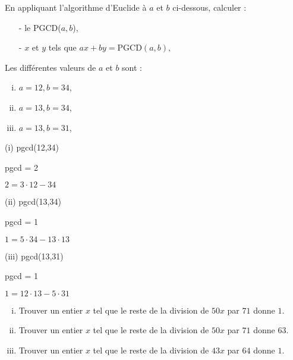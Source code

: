 
\vspace*{0.8cm}
\begin{exo}
En appliquant l'algorithme d'Euclide \`a $a$ et $b$ ci-dessous, calculer :
\begin{itemize}
\item[-] le PGCD($a,b$),
\item[-] $x$ et $y$ tels que $ ax + by = \text{PGCD}(a,b),$
\end{itemize}
Les diff\'erentes valeurs de $a$ et $b$ sont :
\begin{enumerate}[(i)]
\item $a = 12, b = 34$,
\item $a = 13, b = 34$,
\item $a = 13, b = 31$,
\end{enumerate}
\end{exo}

\begin{minipage}{0.33\textwidth}
   (i) pgcd(12,34)
   \vspace{0.5cm}

   pgcd = 2
   \vspace{0.5cm}

   $2 = 3 \cdot 12 - 34$
\end{minipage}\begin{minipage}{0.33\textwidth}
   (ii) pgcd(13,34)
   \vspace{0.5cm}

   pgcd = 1
   \vspace{0.5cm}

   $1 = 5 \cdot 34 - 13 \cdot 13 $
\end{minipage}\begin{minipage}{0.33\textwidth}
   (iii) pgcd(13,31)
   \vspace{0.5cm}

   pgcd = 1
   \vspace{0.5cm}

   $1 = 12 \cdot 13 - 5 \cdot 31$
\end{minipage}

\newpage

\vspace*{0.8cm}
\begin{exo} 
\begin{enumerate}[(i)]
\item Trouver un entier $x$ tel que le reste de la division de $50x$ par $71$ donne $1$.
\item Trouver un entier $x$ tel que le reste de la division de $50x$ par $71$ donne $63$.
\item Trouver un entier $x$ tel que le reste de la division de $43x$ par $64$ donne $1$.
\end{enumerate}
\end{exo}

